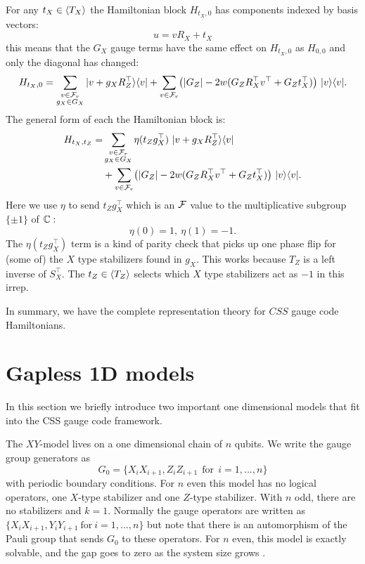 For any $t_X\in \langle T_X \rangle$ the Hamiltonian block $H_{t_X,0}$
has components indexed by basis vectors:
$$
    u = v R_X + t_X
$$
this means that the $G_X$ gauge terms
have the same effect on $H_{t_X,0}$
as $H_{0,0}$ and only the diagonal has changed:
$$
H_{t_X,0} = \sum_{\substack{v\in\mathcal{F}_{r}\\g_X\in G_X } }
  |{v+g_X  R_Z^\top}\rangle\langle{v}| 
  + \sum_{v\in\mathcal{F}_{r}} \bigl(
    |G_Z| - 2w(G_Z R_X^\top v^\top + G_Z t_X^\top)
    \bigr) \ |{v}\rangle\langle{v}|.
$$
The general form of
each the Hamiltonian block is:
\begin{align*}
H_{t_X,t_Z} = &\sum_{\substack{v\in\mathcal{F}_{r}\\g_X\in G_X } }
    \eta(t_Z g_X^\top)
  \ |{v+g_X  R_Z^\top}\rangle\langle{v}| \\
  &+ \sum_{v\in\mathcal{F}_{r}} \bigl(
    |G_Z| - 2w(G_Z R_X^\top v^\top + G_Z t_X^\top)
    \bigr) \ |{v}\rangle\langle{v}|.
\end{align*}
Here we use $\eta$ to send 
$t_Zg_X^\top$ which is an $\mathcal{F}$ value
to the multiplicative subgroup $\{\pm1\}$
of $\mathbb{C}:$
$$
    \eta(0) = 1,\ \eta(1) = -1.
$$
The $\eta(t_Zg_X^\top)$ term
is a kind of parity check that
picks up one phase flip for (some of)
the $X$ type stabilizers found in $g_X.$
This works because $T_Z$ is a left inverse
of $S_X^\top.$
The $t_Z\in\langle T_Z \rangle$ selects which
$X$ type stabilizers act as $-1$ in this irrep.

In summary, we have the complete representation
theory for $CSS$ gauge code Hamiltonians.


%

\section{Gapless 1D models}

In this section we briefly introduce two important
one dimensional models that fit into the CSS gauge code framework.

The $XY$-model 
lives on a one dimensional chain of $n$ qubits.
We write the gauge group generators as
$$
    G_0 = \{ X_i X_{i+1}, Z_i Z_{i+1}\ \ \mbox{for}\ \ i=1,...,n \}
$$
with periodic boundary conditions.
For $n$ even this model has no logical operators, one 
$X$-type stabilizer and one $Z$-type stabilizer.
With $n$ odd, there are no stabilizers and $k=1.$
Normally the gauge operators are written as 
$\{ X_i X_{i+1}, Y_i Y_{i+1} \ \mbox{for}\ i=1,...,n \}$
but note that there is an automorphism of the Pauli group
that sends $G_0$ to these operators.
For $n$ even, this model is exactly solvable,
and the gap goes to zero
as the system size grows \cite{Lieb1961}.

